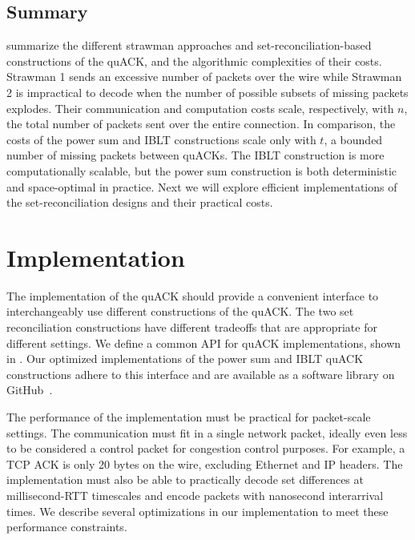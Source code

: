 \subsection{Summary}





 summarize the
different strawman approaches and set-reconciliation-based constructions of
the quACK, and the algorithmic complexities of their costs.
Strawman 1 sends an excessive number of packets over the wire while Strawman 2
is impractical to decode when the number of possible subsets of missing packets
explodes. Their communication and computation costs scale, respectively, with
$n$, the total number of packets sent over the entire connection.
In comparison, the costs of the power sum and IBLT constructions scale only
with $t$, a bounded number of missing packets between quACKs. The IBLT
construction is more computationally scalable, but the power sum construction is
both deterministic and space-optimal in practice.
Next we will explore efficient implementations of the
set-reconciliation designs and their practical costs.

\section{Implementation}
\label{sec:quack:implementation}



The implementation of the quACK should provide a convenient interface to
interchangeably use different constructions of the quACK. The two set
reconciliation constructions have different tradeoffs that are appropriate for
different settings. We define a common API for quACK implementations, shown in
. Our optimized implementations of the power sum and
IBLT quACK constructions adhere to this interface and are available as a
software library on GitHub~\cite{quack-github}.

The performance of the implementation must be practical for packet-scale
settings. The communication must fit in a single network packet, ideally even
less to be considered a control packet for congestion control purposes. For
example, a TCP ACK is only 20 bytes on the wire, excluding Ethernet and IP
headers. The implementation must also be able to practically decode set
differences at millisecond-RTT timescales and encode packets with nanosecond
interarrival times. We describe several optimizations in our implementation to
meet these performance constraints.


